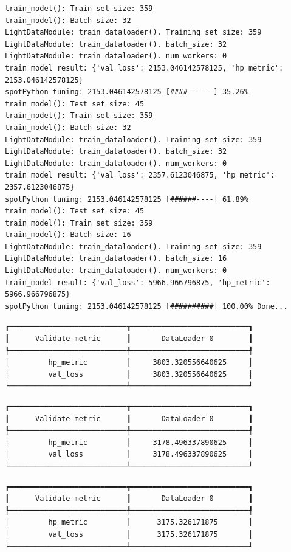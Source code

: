 \documentclass[
  letterpaper,
  DIV=11,
  numbers=noendperiod]{scrreprt}
\begin{document}
\begin{verbatim}
train_model(): Train set size: 359
train_model(): Batch size: 32
LightDataModule: train_dataloader(). Training set size: 359
LightDataModule: train_dataloader(). batch_size: 32
LightDataModule: train_dataloader(). num_workers: 0
train_model result: {'val_loss': 2153.046142578125, 'hp_metric': 2153.046142578125}
spotPython tuning: 2153.046142578125 [####------] 35.26% 
train_model(): Test set size: 45
train_model(): Train set size: 359
train_model(): Batch size: 32
LightDataModule: train_dataloader(). Training set size: 359
LightDataModule: train_dataloader(). batch_size: 32
LightDataModule: train_dataloader(). num_workers: 0
train_model result: {'val_loss': 2357.6123046875, 'hp_metric': 2357.6123046875}
spotPython tuning: 2153.046142578125 [######----] 61.89% 
train_model(): Test set size: 45
train_model(): Train set size: 359
train_model(): Batch size: 16
LightDataModule: train_dataloader(). Training set size: 359
LightDataModule: train_dataloader(). batch_size: 16
LightDataModule: train_dataloader(). num_workers: 0
train_model result: {'val_loss': 5966.966796875, 'hp_metric': 5966.966796875}
spotPython tuning: 2153.046142578125 [##########] 100.00% Done...
\end{verbatim}

\begin{verbatim}
┏━━━━━━━━━━━━━━━━━━━━━━━━━━━┳━━━━━━━━━━━━━━━━━━━━━━━━━━━┓
┃      Validate metric      ┃       DataLoader 0        ┃
┡━━━━━━━━━━━━━━━━━━━━━━━━━━━╇━━━━━━━━━━━━━━━━━━━━━━━━━━━┩
│         hp_metric         │     3803.320556640625     │
│         val_loss          │     3803.320556640625     │
└───────────────────────────┴───────────────────────────┘
\end{verbatim}

\begin{verbatim}
┏━━━━━━━━━━━━━━━━━━━━━━━━━━━┳━━━━━━━━━━━━━━━━━━━━━━━━━━━┓
┃      Validate metric      ┃       DataLoader 0        ┃
┡━━━━━━━━━━━━━━━━━━━━━━━━━━━╇━━━━━━━━━━━━━━━━━━━━━━━━━━━┩
│         hp_metric         │     3178.496337890625     │
│         val_loss          │     3178.496337890625     │
└───────────────────────────┴───────────────────────────┘
\end{verbatim}

\begin{verbatim}
┏━━━━━━━━━━━━━━━━━━━━━━━━━━━┳━━━━━━━━━━━━━━━━━━━━━━━━━━━┓
┃      Validate metric      ┃       DataLoader 0        ┃
┡━━━━━━━━━━━━━━━━━━━━━━━━━━━╇━━━━━━━━━━━━━━━━━━━━━━━━━━━┩
│         hp_metric         │      3175.326171875       │
│         val_loss          │      3175.326171875       │
└───────────────────────────┴───────────────────────────┘
\end{verbatim}
\end{document}
